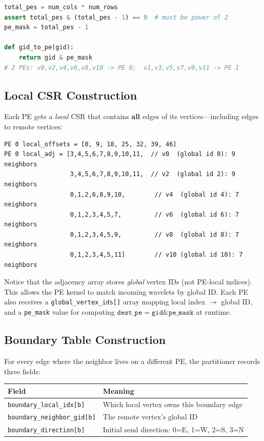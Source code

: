 \documentclass[11pt,letterpaper]{article}
\begin{document}
\begin{lstlisting}[language=Python, caption={Hash-based vertex-to-PE assignment (from \texttt{run\_csl\_tests.py})}, label=lst:assign]
total_pes = num_cols * num_rows
assert total_pes & (total_pes - 1) == 0  # must be power of 2
pe_mask = total_pes - 1

def gid_to_pe(gid):
    return gid & pe_mask
# 2 PEs: v0,v2,v4,v6,v8,v10 -> PE 0;  v1,v3,v5,v7,v9,v11 -> PE 1
\end{lstlisting}

\subsection{Local CSR Construction}

Each PE gets a \emph{local} CSR that contains \textbf{all} edges of its vertices---including edges to remote vertices: 

\begin{lstlisting}[numbers=none, caption={PE\,0's local CSR (6 vertices, 46 adjacency entries)}]
PE 0 local_offsets = [0, 9, 18, 25, 32, 39, 46]
PE 0 local_adj = [3,4,5,6,7,8,9,10,11,  // v0  (global id 0): 9 neighbors
                  3,4,5,6,7,8,9,10,11,  // v2  (global id 2): 9 neighbors
                  0,1,2,6,8,9,10,        // v4  (global id 4): 7 neighbors
                  0,1,2,3,4,5,7,         // v6  (global id 6): 7 neighbors
                  0,1,2,3,4,5,9,         // v8  (global id 8): 7 neighbors
                  0,1,2,3,4,5,11]        // v10 (global id 10): 7 neighbors
\end{lstlisting}

Notice that the adjacency array stores \emph{global} vertex IDs (not PE-local indices). This allows the PE kernel to match incoming wavelets by global ID. Each PE also receives a \texttt{global\_vertex\_ids[]} array mapping local index $\to$ global ID, and a \texttt{pe\_mask} value for computing $\texttt{dest\_pe} = \texttt{gid} \mathbin{\&} \texttt{pe\_mask}$ at runtime.

\subsection{Boundary Table Construction}

For every edge where the neighbor lives on a different PE, the partitioner records three fields:

\begin{center}
\renewcommand{\arraystretch}{1.2}
\begin{tabular}{ll}
\toprule
\textbf{Field} & \textbf{Meaning} \\
\midrule
\texttt{boundary\_local\_idx[b]} & Which local vertex owns this boundary edge \\
\texttt{boundary\_neighbor\_gid[b]} & The remote vertex's global ID \\
\texttt{boundary\_direction[b]}  & Initial send direction: 0=E, 1=W, 2=S, 3=N \\
\bottomrule
\end{tabular}
\end{center}
\end{document}
